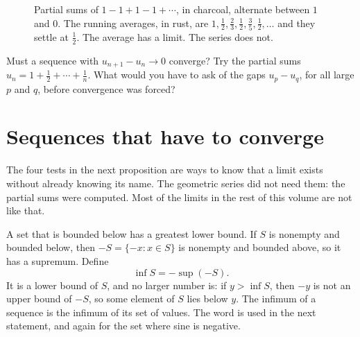 \begin{figure}[ht]
\centering
{}
\caption{Partial sums of $1-1+1-1+\cdots$, in charcoal, alternate between $1$ and $0$. The running averages, in rust, are $1,\frac12,\frac23,\frac12,\frac35,\frac12,\ldots$ and they settle at $\frac12$. The average has a limit. The series does not.}
\label{fig:grandi}
\end{figure}

\begin{think}
Must a sequence with $u_{n+1}-u_n\to0$ converge? Try the partial sums $u_n=1+\frac12+\cdots+\frac1n$. What would you have to ask of the gaps $u_p-u_q$, for all large $p$ and $q$, before convergence was forced?
\end{think}

\section{Sequences that have to converge}

The four tests in the next proposition are ways to know that a limit exists without already knowing its name. The geometric series did not need them: the partial sums were computed. Most of the limits in the rest of this volume are not like that.

A set that is bounded below has a greatest lower bound.\label{sym:inf} If $S$ is nonempty and bounded below, then $-S=\{-x:x\in S\}$ is nonempty and bounded above, so it has a supremum. Define
\[
\inf S=-\sup(-S).
\]
It is a lower bound of $S$, and no larger number is: if $y>\inf S$, then $-y$ is not an upper bound of $-S$, so some element of $S$ lies below $y$. The infimum of a sequence is the infimum of its set of values. The word is used in the next statement, and again for the set where sine is negative.

